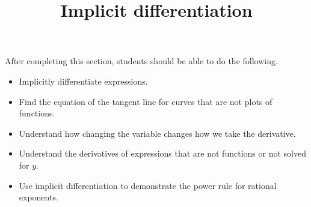 \documentclass{ximera}
\title{Implicit differentiation}
\begin{document}
\begin{abstract}
\end{abstract}

\maketitle

\begin{sectionOutcomes}

After completing this section, students should be able to do the following.

\begin{itemize}
	\item Implicitly differentiate expressions.
	\item Find the equation of the tangent line for curves that
          are not plots of functions.
	\item Understand how changing the variable changes how we take
          the derivative.
	\item Understand the derivatives of expressions that are not
          functions or not solved for $y$.
	\item Use implicit differentiation to demonstrate the power
          rule for rational exponents.
\end{itemize}

\end{sectionOutcomes}
\end{document}
